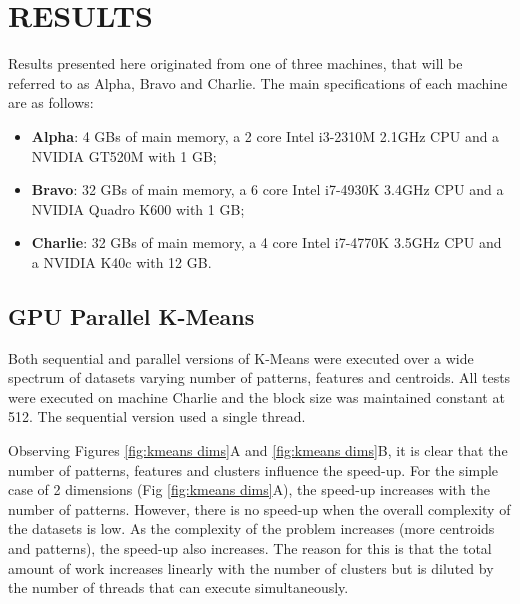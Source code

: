\section{\uppercase{Results}}
\label{sec:resul}

\noindent Results presented here originated from one of three machines, that will be referred to as Alpha, Bravo and Charlie.
The main specifications of each machine are as follows:
\begin{itemize}
  \item \textbf{Alpha}: 4 GBs of main memory, a 2 core Intel i3-2310M 2.1GHz CPU and a NVIDIA GT520M with 1 GB;
  \item \textbf{Bravo}: 32 GBs of main memory, a 6 core Intel i7-4930K 3.4GHz CPU and a NVIDIA Quadro K600 with 1 GB;
  \item \textbf{Charlie}: 32 GBs of main memory, a 4 core Intel i7-4770K 3.5GHz CPU and a NVIDIA K40c with 12 GB.
\end{itemize}

\subsection{GPU Parallel K-Means}

\noindent Both sequential and parallel versions of K-Means were executed over a wide spectrum of datasets varying number of patterns, features and centroids.
All tests were executed on machine Charlie and the block size was maintained constant at 512.
The sequential version used a single thread.

Observing Figures \ref{fig:kmeans dims}A and \ref{fig:kmeans dims}B, it is clear that the number of patterns, features and clusters influence the speed-up.
For the simple case of 2 dimensions (Fig \ref{fig:kmeans dims}A), the speed-up increases with the number of patterns.
However, there is no speed-up when the overall complexity of the datasets is low.
As the complexity of the problem increases (more centroids and patterns), the speed-up also increases.
The reason for this is that the total amount of work increases linearly with the number of clusters but is diluted by the number of threads that can execute simultaneously.

